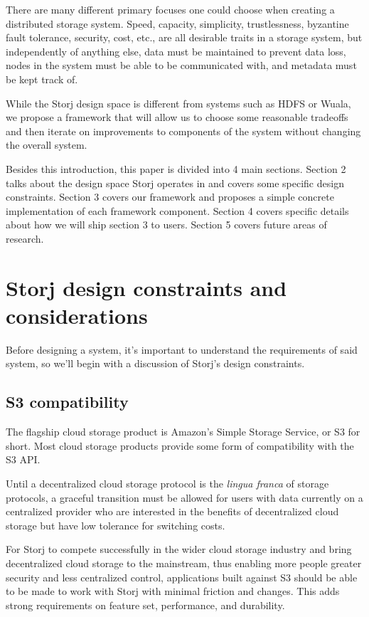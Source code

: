 \documentclass[a4paper,10pt]{article}
\begin{document}
There are many different primary focuses one could choose when creating a
distributed storage system.
  Speed,
  capacity,
  simplicity,
  trustlessness,
  byzantine fault tolerance,
  security,
  cost,
  etc.,
are all desirable traits in a storage system,
but independently of anything else,
  data must be maintained to prevent data loss,
  nodes in the system must be able to be communicated with,
  and metadata must be kept track of.

While the Storj design space is different from systems such as HDFS or Wuala,
we propose a framework that will allow us to choose some reasonable tradeoffs
and then iterate on improvements to components of the system without changing
the overall system.

Besides this introduction, this paper is divided into 4 main sections.
Section 2 talks about the design space Storj operates in and covers some
specific design constraints.
Section 3 covers our framework and proposes a simple concrete implementation of
each framework component.
Section 4 covers specific details about how we will ship section 3 to users.
Section 5 covers future areas of research.

\section{Storj design constraints and considerations}

Before designing a system, it's important to understand the requirements of
said system, so we'll begin with a discussion of Storj's design constraints.

\subsection{S3 compatibility}

The flagship cloud storage product is Amazon's Simple Storage Service, or S3
for short. Most cloud storage products provide some form of compatibility with
the S3 API.

Until a decentralized cloud storage protocol is the {\em lingua franca} of
storage protocols, a graceful transition must be allowed for users with data
currently on a centralized provider who are interested in the benefits of
decentralized cloud storage but have low tolerance for switching costs.

For Storj to compete successfully in the wider cloud storage industry and bring
decentralized cloud storage to the mainstream, thus enabling more people
greater security and less centralized control, applications built against S3
should be able to be made to work with Storj with minimal friction and changes.
This adds strong requirements on feature set, performance, and durability.
\end{document}
